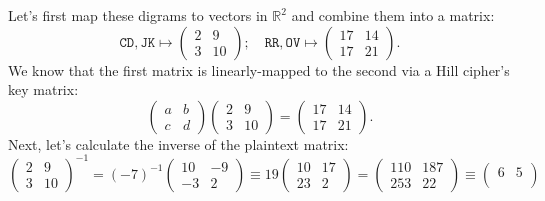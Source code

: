 \documentclass[12pt]{article}
\newenvironment{answer}
    {\begin{adjustwidth}{0pt}{0pt}}
    {\end{adjustwidth}}
\theoremstyle{remark}  %
\begin{document}
    \begin{answer}
        Let's first map these digrams to vectors in $\mathbb{R}^2$ and combine them into a matrix: $$
            \texttt{CD},\texttt{JK} \mapsto \begin{pmatrix}
                2 & 9 \\
                3 & 10
            \end{pmatrix}; \quad
            \texttt{RR},\texttt{OV} \mapsto \begin{pmatrix}
                17 & 14 \\
                17 & 21
            \end{pmatrix}.
        $$ We know that the first matrix is linearly-mapped to the second via a Hill cipher's key matrix: $$
            \begin{pmatrix}
                a & b \\
                c & d
            \end{pmatrix}
            \begin{pmatrix}
                2 & 9 \\
                3 & 10
            \end{pmatrix} = 
            \begin{pmatrix}
                17 & 14 \\
                17 & 21
            \end{pmatrix}.
        $$ Next, let's calculate the inverse of the plaintext matrix:$$
            \begin{pmatrix}
                2 & 9 \\
                3 & 10
            \end{pmatrix}^{-1} = (-7)^{-1}
            \begin{pmatrix}
                10 & -9 \\
                -3 & 2
            \end{pmatrix} \equiv 19
            \begin{pmatrix}
                10 & 17 \\
                23 & 2
            \end{pmatrix} =
            \begin{pmatrix}
                110 & 187 \\
                253 & 22
            \end{pmatrix} \equiv
            \begin{pmatrix}
                6 & 5 \\

\end{pmatrix}$$
\end{answer}
\end{document}
